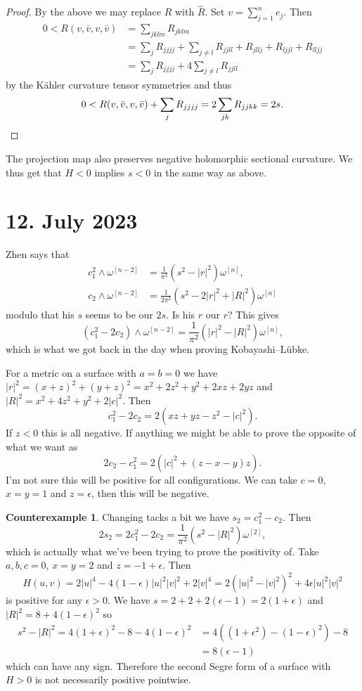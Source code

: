\documentclass[11pt]{amsart}
\theoremstyle{definition}
\newtheorem{cexam}[theo]{Counterexample}
\def\^#1{^{[#1]}}
\begin{document}
\begin{proof}
By the above we may replace $R$ with $\widehat R$.
Set $v = \sum_{j=1}^n e_j$. Then
\begin{align*}
0 < R(v, \bar v, v, \bar v)
&= \sum_{jklm} R_{jklm}
\\
&=
\sum_j R_{jjjj}
+ \sum_{j\not=l} R_{jjll} + R_{jllj} + R_{ljjl} + R_{lljj}
\\
&=
\sum_j R_{jjjj}
+ 4 \sum_{j\not=l} R_{jjll}
\end{align*}
by the K\"ahler curvature tensor symmetries
and thus
\[
0 < R(v, \bar v, v, \bar v) + \sum_j R_{jjjj}
= 2 \sum_{jk} R_{jjkk}
= 2s.
\qedhere
\]
\end{proof}

The projection map also preserves negative holomorphic sectional curvature.
We thus get that $H < 0$ implies $s < 0$ in the same way as above.


\section{12. July 2023}

Zhen says that
\begin{align*}
c_1^2 \wedge \omega\^{n-2} &= \frac{1}{\pi^2} ( s^2 - |r|^2 ) \omega\^n,
\\
c_2 \wedge \omega\^{n-2} &= \frac{1}{2 \pi^2} (s^2 - 2 |r|^2 + |R|^2) \omega\^n
\end{align*}
modulo that his $s$ seems to be our $2s$.
Is his $r$ our $r$?
This gives
$$
(c_1^2 - 2 c_2) \wedge \omega\^{n-2}
= \frac{1}{\pi^2} (|r|^2 - |R|^2) \omega\^n,
$$
which is what we got back in the day when proving Kobayashi--L\"ubke.

For a metric on a surface with $a = b = 0$ we have $|r|^2 = (x+z)^2 + (y+z)^2
= x^2 + 2z^2 + y^2 + 2xz + 2yz$
and $|R|^2 = x^2 + 4z^2 + y^2 + 2|c|^2$.
Then
$$
c_1^2 - 2 c_2
= 2(xz + yz - z^2 - |c|^2).
$$
If $z < 0$ this is all negative.
If anything we might be able to prove the opposite of what we want as
$$
2 c_2 - c_1^2
= 2(|c|^2 + (z - x - y)z).
$$
I'm not sure this will be positive for all configurations.
We can take $c = 0$, $x = y = 1$ and $z = \epsilon$, then this will be negative.


\begin{cexam}
Changing tacks a bit we have $s_2 = c_1^2 - c_2$.
Then
$$
2 s_2
= 2 c_1^2 - 2 c_2
= \frac{1}{\pi^2} (s^2 - |R|^2) \omega\^2,
$$
which is actually what we've been trying to prove the positivity of.
Take $a,b,c = 0$, $x = y = 2$ and $z = -1+\epsilon$. Then
$$
H(u,v) = 2 |u|^4 - 4(1-\epsilon) |u|^2|v|^2 + 2|v|^4
= 2 (|u|^2 - |v|^2)^2 + 4 \epsilon |u|^2|v|^2
$$
is positive for any $\epsilon > 0$.
We have $s = 2 + 2 + 2(\epsilon - 1) = 2(1 + \epsilon)$ and
$|R|^2 = 8 + 4(1-\epsilon)^2$ so
\begin{align*}
s^2 - |R|^2
= 4 (1 + \epsilon)^2
- 8 - 4(1 - \epsilon)^2
&= 4((1 + \epsilon^2) - (1 - \epsilon)^2) - 8
\\
&= 8(\epsilon - 1)
\end{align*}
which can have any sign.
Therefore the second Segre form of a surface with $H > 0$ is not necessarily
positive pointwise.
\end{cexam}
\end{document}

